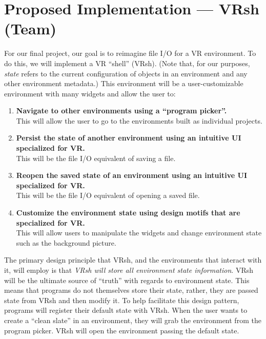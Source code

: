 \documentclass[titlepage,12pt]{article}
\begin{document}
\section{Proposed Implementation --- VRsh (Team)}
For our final project, our goal is to reimagine file I/O for a VR environment.
To do this, we will implement a VR ``shell'' (VRsh). (Note that, for our
purposes, \textit{state} refers to the current configuration of objects in an
environment and any other environment metadata.) This environment will be a
user-customizable environment with many widgets and allow the user to:

\begin{enumerate}
    \item \textbf{Navigate to other environments using a ``program picker''.}\\
        This will allow the user to go to the environments built as individual
        projects.

    \item \textbf{Persist the state of another environment using an intuitive UI
        specialized for VR.} \\
        This will be the file I/O equivalent of saving a file.

    \item \textbf{Reopen the saved state of an environment using an intuitive UI
        specialized for VR.} \\
        This will be the file I/O equivalent of opening a saved file.

    \item \textbf{Customize the environment state using design motifs that are
        specialized for VR.} \\
        This will allow users to manipulate the widgets and change environment
        state such as the background picture.
\end{enumerate}

The primary design principle that VRsh, and the environments that interact with
it, will employ is that \textit{VRsh will store all environment state
information}. VRsh will be the ultimate source of ``truth'' with regards to
environment state. This means that programs do not themselves store their state,
rather, they are passed state from VRsh and then modify it. To help facilitate
this design pattern, programs will register their default state with VRsh.
When the user wants to create a ``clean slate'' in an environment, they will
grab the environment from the program picker. VRsh will open the environment
passing the default state.
\end{document}
